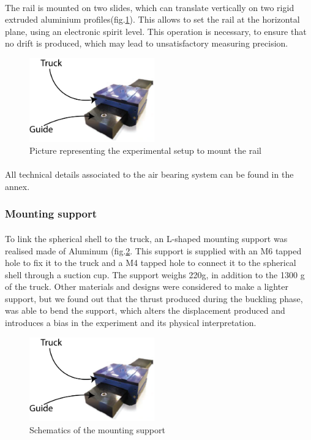 \paragraph{}
The rail is mounted on two slides, which can translate vertically on two rigid extruded aluminium profiles(fig.\ref{fig:setup_rail}). This allows to set the rail at the horizontal plane, using an electronic spirit level. This operation is necessary, to ensure that no drift is produced, which may lead to unsatisfactory measuring precision.
\begin{figure}[H] %
	\centering%
	\includegraphics[width=0.48\textwidth]{figures/Chapter_1/Airbearing.png}
	\caption{Picture representing the experimental setup to mount the rail}
	\label{fig:setup_rail}
\end{figure}

\paragraph{}
All technical details associated to the air bearing system can be found in the annex.
\subsubsection{Mounting support}
\paragraph{}
To link the spherical shell to the truck, an L-shaped mounting support was realised made of Aluminum (fig.\ref{fig:mounting support}. This support is supplied with an M6 tapped hole to fix it to the truck and a M4 tapped hole to connect it to the spherical shell through a suction cup. The support weighs 220g, in addition to the 1300 g of the truck. Other materials and designs were considered to make a lighter support, but we found out that the thrust produced during the buckling phase, was able to bend the support, which alters the displacement produced and introduces a bias in the experiment and its physical interpretation.
\begin{figure}[H] %
	\centering%
	\includegraphics[width=0.48\textwidth]{figures/Chapter_1/Airbearing.png}
	\caption{Schematics of the mounting support}
	\label{fig:mounting support}
\end{figure}

